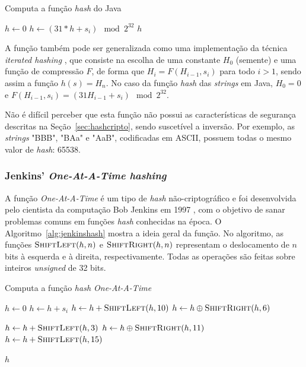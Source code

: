 \begin{algorithm}
\linespread{1}\selectfont
\caption{Computa a função \emph{hash} do Java}
\label{alg:javahash}
\begin{algorithmic}[1]

    \State $h \gets 0$
        \State $h \gets (31 * h + s_i) \mod 2^{32}$
	\EndFor
    \Return $h$
\EndFunction
\end{algorithmic}
\end{algorithm}


A função também pode ser generalizada como uma implementação da técnica \emph{iterated hashing} \cite{lemire2012universality}, que consiste na escolha de uma constante $H_0$ (semente) e uma função de compressão $F$, de forma que $H_i = F(H_{i-1}, s_i)$ para todo $i>1$, sendo assim a função $h(s) = H_n$. No caso da função \emph{hash} das \emph{strings} em Java, $H_0 = 0$ e $F(H_{i-1}, s_i) = (31 H_{i-1} + s_i) \mod 2^{32}$.

Não é difícil perceber que esta função não possui as características de segurança descritas na Seção~\ref{sec:hashcripto}, sendo suscetível a inversão. Por exemplo, as \emph{strings} "BBB", "BAa" e "AaB", codificadas em ASCII, possuem todas o mesmo valor de \emph{hash}: 65538.

\subsubsection{Jenkins' \emph{One-At-A-Time hashing}}

A função \emph{One-At-A-Time} é um tipo de \emph{hash} não-criptográfico e foi desenvolvida pelo cientista da computação Bob Jenkins em 1997 \cite{jenkins1997hash}, com o objetivo de sanar problemas comuns em funções \emph{hash} conhecidas na época. O Algoritmo~\ref{alg:jenkinshash} mostra a ideia geral da função. No algoritmo, as funções $\textsc{ShiftLeft}(h, n)$ e $\textsc{ShiftRight}(h, n)$ representam o deslocamento de $n$ bits à esquerda e à direita, respectivamente. Todas as operações são feitas sobre inteiros \emph{unsigned} de 32 bits.

\begin{algorithm}
\linespread{1}\selectfont
\caption{Computa a função \emph{hash One-At-A-Time}}
\label{alg:jenkinshash}
\begin{algorithmic}[1]

    \State $h \gets 0$
        \State $h \gets h + s_i$
        \State $h \gets h + \Call{ShiftLeft}{h, 10}$
        \State $h \gets h \oplus \Call{ShiftRight}{h,6}$
	\EndFor

    \State $h \gets h + \Call{ShiftLeft}{h, 3}$
    \State $h \gets h \oplus \Call{ShiftRight}{h,11}$
    \State $h \gets h + \Call{ShiftLeft}{h, 15}$

    \Return $h$
\EndFunction
\end{algorithmic}
\end{algorithm}

